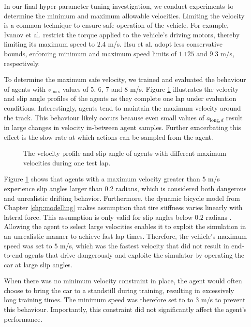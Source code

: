 In our final hyper-parameter tuning investigation, we conduct experiments to determine the minimum and maximum allowable velocities.
Limiting the velocity is a common technique to ensure safe operation of the vehicle.
For example, Ivanov et al. \cite{Ivanov2020} restrict the torque applied to the vehicle's driving motors, thereby limiting its maximum speed to $2.4$ m/s. 
Hsu et al. \cite{hsu2022} adopt less conservative bounds, enforcing minimum and maximum speed limits of $1.125$ and $9.3$ m/s, respectively.

To determine the maximum safe velocity, we trained and evaluated the behaviour of agents with $v_{\text{max}}$ values of $5$, $6$, $7$ and $8$ m/s.
Figure \ref{fig:vel_profile} illustrates the velocity and slip angle profiles of the agents as they complete one lap under evaluation conditions.
Interestingly, agents tend to maintain the maximum velocity around the track.
This behaviour likely occurs because even small values of $a_{\text{long},d}$ result in large changes in velocity in-between agent samples.
Further exacerbating this effect is the slow rate at which actions can be sampled from the agent.

\begin{figure}[htb!]
    \centering
    
    \caption{The velocity profile and slip angle of agents with different maximum velocities during one test lap.}
    \label{fig:vel_profile}
\end{figure}

Figure \ref{fig:vel_profile} shows that agents with a maximum velocity greater than $5$ m/s experience slip angles larger than $0.2$ radians, 
which is considered both dangerous and unrealistic drifting behavior.
Furthermore, the dynamic bicycle model from Chapter \ref{chp:modelling} makes assumption that tire stiffness varies linearly with lateral force.
This assumption is only valid for slip angles below $0.2$ radians \cite{Vorotovic2013}. 
Allowing the agent to select large velocities enables it to exploit the simulation in an unrealistic manner to achieve fast lap times.
Therefore, the vehicle's maximum speed was set to $5$ m/s, which was the fastest velocity that did not result in end-to-end agents that drive dangerously and exploite the simulator by operating the car at large slip angles.


When there was no minimum velocity constraint in place, the agent would often choose to bring the car to a standstill during training, resulting in excessively long training times.
The minimum speed was therefore set to to $3$ m/s to prevent this behaviour.
Importantly, this constraint did not significantly affect the agent's performance.





